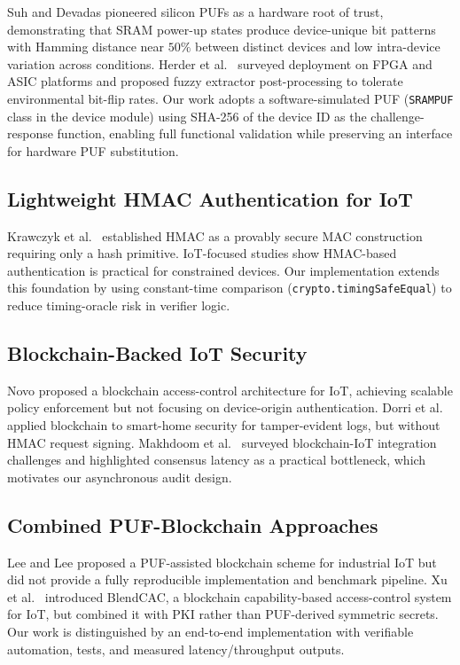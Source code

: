 \documentclass[conference]{IEEEtran}
\begin{document}
Suh and Devadas \cite{suh2007physical} pioneered silicon PUFs as a hardware root of trust, demonstrating that SRAM power-up states produce device-unique bit patterns with Hamming distance near $50\%$ between distinct devices and low intra-device variation across conditions. Herder et al.\ \cite{herder2014puf} surveyed deployment on FPGA and ASIC platforms and proposed fuzzy extractor post-processing to tolerate environmental bit-flip rates. Our work adopts a software-simulated PUF (\texttt{SRAMPUF} class in the device module) using SHA-256 of the device ID as the challenge-response function, enabling full functional validation while preserving an interface for hardware PUF substitution.

\subsection{Lightweight HMAC Authentication for IoT}

Krawczyk et al.\ \cite{rfc2104} established HMAC as a provably secure MAC construction requiring only a hash primitive. IoT-focused studies show HMAC-based authentication is practical for constrained devices. Our implementation extends this foundation by using constant-time comparison (\texttt{crypto.timingSafeEqual}) to reduce timing-oracle risk in verifier logic.

\subsection{Blockchain-Backed IoT Security}

Novo \cite{novo2018blockchain} proposed a blockchain access-control architecture for IoT, achieving scalable policy enforcement but not focusing on device-origin authentication. Dorri et al.\ \cite{dorri2017blockchain} applied blockchain to smart-home security for tamper-evident logs, but without HMAC request signing. Makhdoom et al.\ \cite{makhdoom2019} surveyed blockchain-IoT integration challenges and highlighted consensus latency as a practical bottleneck, which motivates our asynchronous audit design.

\subsection{Combined PUF-Blockchain Approaches}

Lee and Lee \cite{lee2020puf} proposed a PUF-assisted blockchain scheme for industrial IoT but did not provide a fully reproducible implementation and benchmark pipeline. Xu et al.\ \cite{xu2018blendcac} introduced BlendCAC, a blockchain capability-based access-control system for IoT, but combined it with PKI rather than PUF-derived symmetric secrets. Our work is distinguished by an end-to-end implementation with verifiable automation, tests, and measured latency/throughput outputs.
\end{document}
